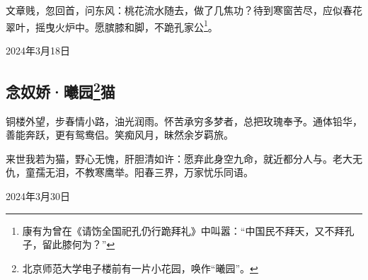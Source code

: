 \documentclass[a5paper]{ctexart}
\begin{document}
	文章贱，忽回首，问东风：桃花流水随去，做了几焦功？待到寒窗苦尽，应似春花翠叶，摇曳火炉中。愿膑膝和脚，不跪孔家公\footnote{康有为曾在《请饬全国祀孔仍行跪拜礼》中叫嚣：“中国民不拜天，又不拜孔子，留此膝何为？”}。
	
	\begin{flushright}
		2024年3月18日
	\end{flushright}
	
	\subsection[念奴娇·曦园猫]{念奴娇·曦园\footnote{北京师范大学电子楼前有一片小花园，唤作“曦园”。}猫}
	铜楼外望，步春情小路，油光润雨。怀苦承穷多梦者，总把玫瑰奉予。通体铅华，善能奔跃，更有鸳鸯侣。笑痴风月，昧然余岁羁旅。
	
	来世我若为猫，野心无愧，肝胆清如许：愿弃此身空九命，就近都分人与。老大无仇，童孺无泪，不教寒鹰举。阳春三界，万家忧乐同语。
	
	\begin{flushright}
		2024年3月30日
	\end{flushright}
	
	
	
	
	
\end{document}
